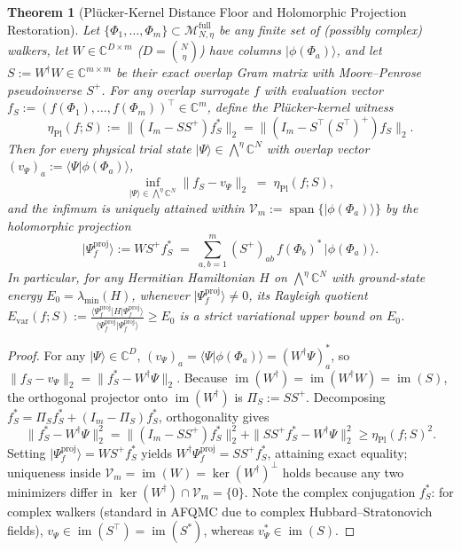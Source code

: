 \documentclass[11pt,a4paper]{article}
\newtheorem{theorem}{Theorem}[section]
\theoremstyle{definition}
\DeclareMathOperator{\im}{im}
\newcommand{\C}{\mathbb{C}}
\newcommand{\ket}[1]{\lvert #1 \rangle}
\newcommand{\bra}[1]{\langle #1 \rvert}
\newcommand{\braket}[2]{\langle #1 \vert #2 \rangle}
\begin{document}
\begin{theorem}[Pl\"ucker-Kernel Distance Floor and Holomorphic Projection Restoration]\label{thm:plucker}
Let $\{\Phi_1,\dots,\Phi_m\} \subset \mathcal{M}_{N,\eta}^{\mathrm{full}}$ be any finite set of (possibly complex) walkers, let $W \in \C^{D \times m}$ ($D = \binom{N}{\eta}$) have columns $\ket{\phi(\Phi_a)}$, and let $S := W^\dagger W \in \C^{m\times m}$ be their exact overlap Gram matrix with Moore--Penrose pseudoinverse $S^+$. For any overlap surrogate $f$ with evaluation vector $f_S := (f(\Phi_1),\dots,f(\Phi_m))^\top \in \C^m$, define the \emph{Pl\"ucker-kernel witness}
\begin{equation}\label{eq:eta_pl}
  \eta_{\mathrm{Pl}}(f; S) := \big\|(I_m - S S^+) f_S^*\big\|_2 = \big\|(I_m - S^\top (S^\top)^+) f_S\big\|_2.
\end{equation}
Then for every physical trial state $\ket{\Psi} \in \bigwedge^\eta \C^N$ with overlap vector $(v_\Psi)_a := \braket{\Psi}{\phi(\Phi_a)}$,
\[
  \inf_{\ket{\Psi} \in \bigwedge^\eta \C^N} \|f_S - v_\Psi\|_2 \;=\; \eta_{\mathrm{Pl}}(f; S),
\]
and the infimum is uniquely attained within $\mathcal{V}_m := \operatorname{span}\{\ket{\phi(\Phi_a)}\}$ by the holomorphic projection
\begin{equation}\label{eq:proj_state}
  \ket{\Psi_f^{\mathrm{proj}}} := W S^+ f_S^* \;=\; \sum_{a,b=1}^m (S^+)_{ab}\, f(\Phi_b)^*\, \ket{\phi(\Phi_a)}.
\end{equation}
In particular, for any Hermitian Hamiltonian $H$ on $\bigwedge^\eta \C^N$ with ground-state energy $E_0 = \lambda_{\min}(H)$, whenever $\ket{\Psi_f^{\mathrm{proj}}} \neq 0$, its Rayleigh quotient $E_{\mathrm{var}}(f;S) := \frac{\bra{\Psi_f^{\mathrm{proj}}} H \ket{\Psi_f^{\mathrm{proj}}}}{\braket{\Psi_f^{\mathrm{proj}}}{\Psi_f^{\mathrm{proj}}}} \ge E_0$ is a strict variational upper bound on $E_0$.
\end{theorem}

\begin{proof}
For any $\ket{\Psi} \in \C^D$, $(v_\Psi)_a = \braket{\Psi}{\phi(\Phi_a)} = (W^\dagger \Psi)_a^*$, so $\|f_S - v_\Psi\|_2 = \|f_S^* - W^\dagger \Psi\|_2$. Because $\im(W^\dagger) = \im(W^\dagger W) = \im(S)$, the orthogonal projector onto $\im(W^\dagger)$ is $\Pi_S := S S^+$. Decomposing $f_S^* = \Pi_S f_S^* + (I_m - \Pi_S) f_S^*$, orthogonality gives
\[
  \|f_S^* - W^\dagger \Psi\|_2^2 = \|(I_m - S S^+) f_S^*\|_2^2 + \|S S^+ f_S^* - W^\dagger \Psi\|_2^2 \ge \eta_{\mathrm{Pl}}(f; S)^2.
\]
Setting $\ket{\Psi_f^{\mathrm{proj}}} = W S^+ f_S^*$ yields $W^\dagger \Psi_f^{\mathrm{proj}} = S S^+ f_S^*$, attaining exact equality; uniqueness inside $\mathcal{V}_m = \im(W) = \ker(W^\dagger)^\perp$ holds because any two minimizers differ in $\ker(W^\dagger) \cap \mathcal{V}_m = \{0\}$. Note the complex conjugation $f_S^*$: for complex walkers (standard in AFQMC due to complex Hubbard--Stratonovich fields), $v_\Psi \in \im(S^\top) = \im(S^*)$, whereas $v_\Psi^* \in \im(S)$.
\end{proof}
\end{document}
